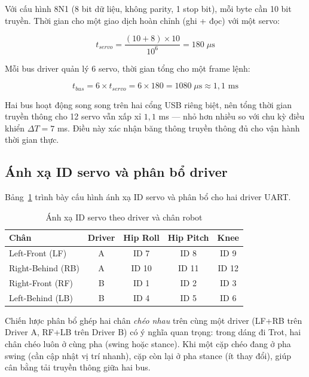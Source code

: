 Với cấu hình 8N1 (8 bit dữ liệu, không parity, 1 stop bit), mỗi byte cần 10 bit truyền. Thời gian cho một giao dịch hoàn chỉnh (ghi + đọc) với một servo:

\begin{equation}
    t_{servo} = \frac{(10 + 8) \times 10}{10^6} = 180 \; \mu\text{s}
\end{equation}

Mỗi bus driver quản lý 6 servo, thời gian tổng cho một frame lệnh:

\begin{equation}
    t_{bus} = 6 \times t_{servo} = 6 \times 180 = 1080 \; \mu\text{s} \approx 1{,}1 \text{ ms}
\end{equation}

Hai bus hoạt động song song trên hai cổng USB riêng biệt, nên tổng thời gian truyền thông cho 12 servo vẫn xấp xỉ $1{,}1$ ms --- nhỏ hơn nhiều so với chu kỳ điều khiển $\Delta T = 7$ ms. Điều này xác nhận băng thông truyền thông đủ cho vận hành thời gian thực.

\subsection{Ánh xạ ID servo và phân bổ driver}

Bảng~\ref{tab:servo_mapping} trình bày cấu hình ánh xạ ID servo và phân bổ cho hai driver UART.

\begin{table}[H]
\centering
\caption{Ánh xạ ID servo theo driver và chân robot}
\label{tab:servo_mapping}
\renewcommand{\arraystretch}{1.3}
\begin{tabular}{|l|c|c|c|c|}
\hline
\textbf{Chân} & \textbf{Driver} & \textbf{Hip Roll} & \textbf{Hip Pitch} & \textbf{Knee} \\ \hline
Left-Front (LF) & A & ID 7 & ID 8 & ID 9 \\ \hline
Right-Behind (RB) & A & ID 10 & ID 11 & ID 12 \\ \hline
Right-Front (RF) & B & ID 1 & ID 2 & ID 3 \\ \hline
Left-Behind (LB) & B & ID 4 & ID 5 & ID 6 \\ \hline
\end{tabular}
\end{table}

Chiến lược phân bổ ghép hai chân \textit{chéo nhau} trên cùng một driver (LF+RB trên Driver A, RF+LB trên Driver B) có ý nghĩa quan trọng: trong dáng đi Trot, hai chân chéo luôn ở cùng pha (swing hoặc stance). Khi một cặp chéo đang ở pha swing (cần cập nhật vị trí nhanh), cặp còn lại ở pha stance (ít thay đổi), giúp cân bằng tải truyền thông giữa hai bus.

